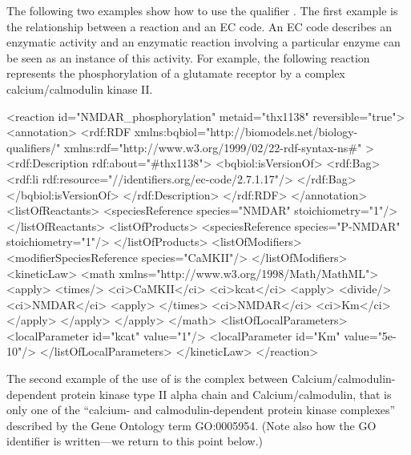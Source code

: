 
The following two examples show how to use the qualifier
. The first example is the relationship
between a reaction and an EC code. An EC code describes an
enzymatic activity and an enzymatic reaction involving a
particular enzyme can be seen as an instance of this activity. For
example, the following reaction represents the phosphorylation of
a glutamate receptor by a complex calcium/calmodulin kinase II.

\begin{example}
<reaction id="NMDAR_phosphorylation" metaid="thx1138"
          reversible="true">
  <annotation>
    <rdf:RDF
      xmlns:bqbiol="http://biomodels.net/biology-qualifiers/"
      xmlns:rdf="http://www.w3.org/1999/02/22-rdf-syntax-ns\#"
    >
      <rdf:Description rdf:about="#thx1138">
        <bqbiol:isVersionOf>
          <rdf:Bag>
            <rdf:li rdf:resource="//identifiers.org/ec-code/2.7.1.17\!"/>
          </rdf:Bag>
        </bqbiol:isVersionOf>
      </rdf:Description>
    </rdf:RDF>
  </annotation>
  <listOfReactants>
    <speciesReference species="NMDAR" stoichiometry="1"/>
  </listOfReactants>
  <listOfProducts>
    <speciesReference species="P-NMDAR" stoichiometry="1"/>
  </listOfProducts>
  <listOfModifiers>
    <modifierSpeciesReference species="CaMKII"/>
  </listOfModifiers>
  <kineticLaw>
    <math xmlns="http://www.w3.org/1998/Math/MathML">
      <apply>
        <times/>
        <ci>CaMKII</ci>
        <ci>kcat</ci>
        <apply>
          <divide/>
          <ci>NMDAR</ci>
          <apply> </times> <ci>NMDAR</ci> <ci>Km</ci> </apply>
        </apply>
      </apply>
    </math>
    <listOfLocalParameters>
      <localParameter id="kcat" value="1"/>
      <localParameter id="Km" value="5e-10"/>
    </listOfLocalParameters>
  </kineticLaw>
</reaction>
\end{example}

The second example of the use of  is the
complex between Calcium/calmodulin-dependent protein kinase type
II alpha chain and Calcium/calmodulin, that is only one of the
``calcium- and calmodulin-dependent protein kinase complexes''
described by the Gene Ontology term GO:0005954.  (Note also how
the GO identifier is written---we return to this point below.)


